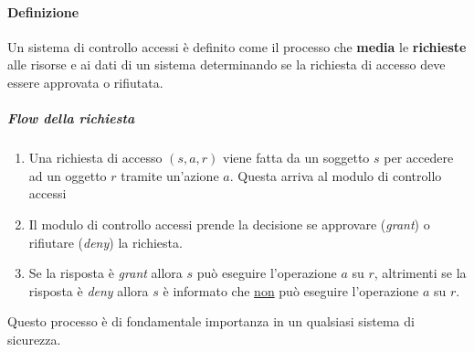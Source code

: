         \paragraph{Definizione} Un sistema di controllo accessi è definito come il processo che \textbf{media} le \textbf{richieste} alle risorse e ai dati di un sistema determinando se la richiesta di accesso deve essere approvata o rifiutata.
            \subparagraph{\textit{Flow} della richiesta} \begin{enumerate}
                \item Una richiesta di accesso $(s,a,r)$ viene fatta da un soggetto $s$ per accedere ad un oggetto $r$ tramite un'azione $a$. Questa arriva al modulo di controllo accessi
                \item Il modulo di controllo accessi prende la decisione se approvare (\textit{grant}) o rifiutare (\textit{deny}) la richiesta.
                \item Se la risposta è \textit{grant} allora $s$ può eseguire l'operazione $a$ su $r$, altrimenti se la risposta è \textit{deny} allora $s$ è informato che \underline{non} può eseguire l'operazione $a$ su $r$.
            \end{enumerate}
        Questo processo è di fondamentale importanza in un qualsiasi sistema di sicurezza.